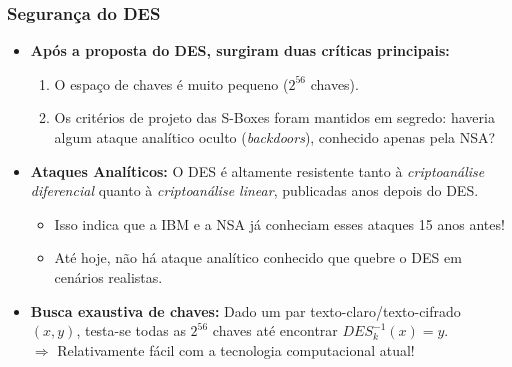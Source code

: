 \documentclass{beamer}
\begin{document}
\begin{frame}
    \frametitle{Segurança do DES}

    \begin{itemize}
        \item \textbf{Após a proposta do DES, surgiram duas críticas principais:}
        \begin{enumerate}
            \item O espaço de chaves é muito pequeno (\( 2^{56} \) chaves).
            \item Os critérios de projeto das S-Boxes foram mantidos em segredo: haveria algum ataque analítico oculto (\textit{backdoors}), conhecido apenas pela NSA?
        \end{enumerate}
    \end{itemize}

    \begin{itemize}
        \item \textbf{Ataques Analíticos:} O DES é altamente resistente tanto à \textit{criptoanálise diferencial} quanto à \textit{criptoanálise linear}, publicadas anos depois do DES. 
        \begin{itemize}
            \item Isso indica que a IBM e a NSA já conheciam esses ataques 15 anos antes!
            \item Até hoje, não há ataque analítico conhecido que quebre o DES em cenários realistas.
        \end{itemize}
    \end{itemize}

    \begin{itemize}
        \item \textbf{Busca exaustiva de chaves:} Dado um par texto-claro/texto-cifrado \((x, y)\), testa-se todas as \( 2^{56} \) chaves até encontrar \( DES_k^{-1}(x) = y \). \\
        \(\Rightarrow\) Relativamente fácil com a tecnologia computacional atual!
    \end{itemize}
\end{frame}

\end{document}
